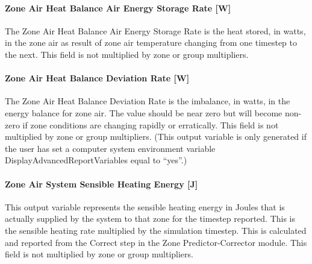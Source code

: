 \paragraph{Zone Air Heat Balance Air Energy Storage Rate {[}W{]}}\label{zone-air-heat-balance-air-energy-storage-rate-w}

The Zone Air Heat Balance Air Energy Storage Rate is the heat stored, in watts, in the zone air as result of zone air temperature changing from one timestep to the next. This field is not multiplied by zone or group multipliers.

\paragraph{Zone Air Heat Balance Deviation Rate {[}W{]}}\label{zone-air-heat-balance-deviation-rate-w}

The Zone Air Heat Balance Deviation Rate is the imbalance, in watts, in the energy balance for zone air. The value should be near zero but will become non-zero if zone conditions are changing rapidly or erratically. This field is not multiplied by zone or group multipliers. (This output variable is only generated if the user has set a computer system environment variable DisplayAdvancedReportVariables equal to ``yes''.)

\paragraph{Zone Air System Sensible Heating Energy {[}J{]}}\label{zone-air-system-sensible-heating-energy-j}

This output variable represents the sensible heating energy in Joules that is actually supplied by the system to that zone for the timestep reported. This is the sensible heating rate multiplied by the simulation timestep. This is calculated and reported from the Correct step in the Zone Predictor-Corrector module. This field is not multiplied by zone or group multipliers.

